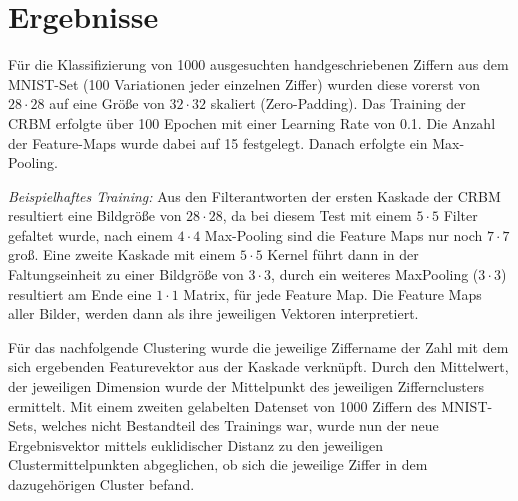 \section{Ergebnisse}\label{results}
Für die Klassifizierung von 1000 ausgesuchten handgeschriebenen Ziffern aus dem MNIST-Set (100 Variationen jeder einzelnen Ziffer) wurden diese vorerst von $28 \cdot 28$ auf eine Größe von $32 \cdot 32$ skaliert (Zero-Padding). Das Training der CRBM erfolgte über 100 Epochen mit einer Learning Rate von 0.1. Die Anzahl der Feature-Maps wurde dabei auf 15 festgelegt.
Danach erfolgte ein Max-Pooling. 
\newline 

\textit{Beispielhaftes Training:}
Aus den Filterantworten der ersten Kaskade der CRBM resultiert eine Bildgröße von $28 \cdot 28$, da bei diesem Test mit einem $5 \cdot 5$ Filter gefaltet wurde, nach einem $4 \cdot 4$ Max-Pooling sind die Feature Maps nur noch $7 \cdot 7$ groß. Eine zweite Kaskade mit einem  $5 \cdot 5$ Kernel führt dann in der Faltungseinheit zu einer Bildgröße von $3 \cdot 3$, durch ein weiteres MaxPooling ($3 \cdot 3$) resultiert am Ende eine $1 \cdot 1$ Matrix, für jede Feature Map. Die Feature Maps aller Bilder, werden dann als ihre jeweiligen Vektoren interpretiert.

Für das nachfolgende Clustering wurde die jeweilige Ziffername der Zahl mit dem sich ergebenden Featurevektor aus der Kaskade verknüpft. Durch den Mittelwert, der jeweiligen Dimension wurde der Mittelpunkt des jeweiligen Ziffernclusters ermittelt.
Mit einem zweiten gelabelten Datenset von 1000 Ziffern des MNIST-Sets, welches nicht Bestandteil des Trainings war, wurde nun der neue Ergebnisvektor mittels euklidischer Distanz zu den jeweiligen Clustermittelpunkten abgeglichen, ob sich die jeweilige Ziffer in dem dazugehörigen Cluster befand.